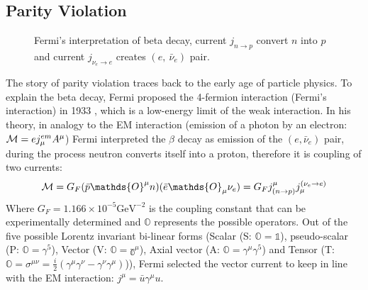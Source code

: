 \subsection{Parity Violation}
\begin{figure}[H]
    \centering
    \caption{Fermi's interpretation of beta decay, current $j_{n \rightarrow p}$ 
    convert $n$ into $p$ and current $j_{\nu_e \rightarrow e}$ creates $(e, \ \bar{\nu}_e) $
    pair.}
\end{figure}
The story of parity violation traces back to the early age of particle physics. 
To explain the beta decay, Fermi proposed the 4-fermion interaction 
(Fermi's interaction) in 1933 \cite{Fermi1934}, which is a low-energy limit of the 
weak interaction. In his theory, in analogy to the EM interaction (emission of a
photon by an electron: $\mathcal{M} = ej_\mu^{em} A^\mu$) Fermi interpreted the $\beta$
decay as emission of the $(e, \bar{\nu}_e)$ pair, during the process neutron converts
itself into a proton, therefore it is coupling of two currents:
\begin{equation}
    \CM = G_F (\bar{p} \mathds{O}^\mu n)(\bar{e} \mathds{O}_\mu \nu_e) 
	= G_F j^\mu_{(n\rightarrow p)} j_\mu^{(\nu_e\rightarrow e)}
\end{equation}
Where $G_F = 1.166 \times 10^{-5} \mathrm{GeV}^{-2}$ is the coupling constant that 
can be experimentally determined and $\mathds{O}$ represents 
the possible operators. Out of the five possible Lorentz invariant bi-linear forms 
(Scalar (S: $\mathds{O} = \mathds{1}$), pseudo-scalar (P: $\mathds{O} = \gamma^5$), 
Vector (V: $\mathds{O} = \mathds{\gamma^\mu}$), Axial vector (A: $\mathds{O} = \gamma^\mu\gamma^5$) 
and Tensor (T: $\mathds{O}=\sigma^{\mu\nu} = \frac{i}{2}(\gamma^\mu\gamma^\nu - \gamma^\nu\gamma^\mu)$)),
Fermi selected the vector current to keep in line with the EM interaction:
$j^\mu = \bar{u} \gamma^\mu u$.

